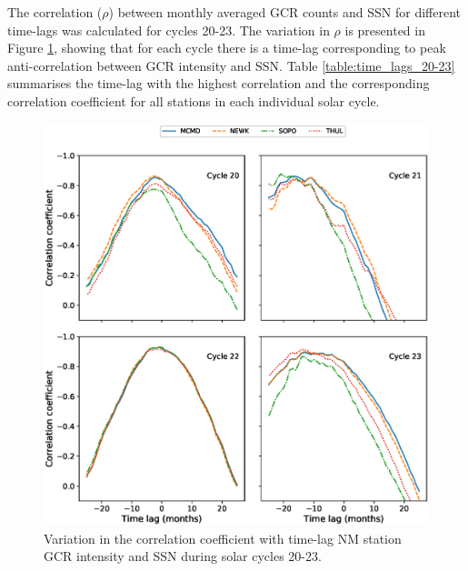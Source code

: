 The correlation ($\rho$) between monthly averaged GCR counts and SSN for different time-lags was calculated for cycles 20-23. The variation in $\rho$ is presented in Figure \ref{fig:time_lags_20-23}, showing that for each cycle there is a time-lag corresponding to peak anti-correlation between GCR intensity and SSN. Table \ref{table:time_lags_20-23} summarises the time-lag with the highest correlation and the corresponding correlation coefficient for all stations in each individual solar cycle.


\begin{figure}
	\includegraphics[width=\columnwidth]{Lag.eps}
	\caption{Variation in the correlation coefficient with time-lag NM station GCR intensity and SSN during solar cycles 20-23.}
	\label{fig:time_lags_20-23}
\end{figure}


